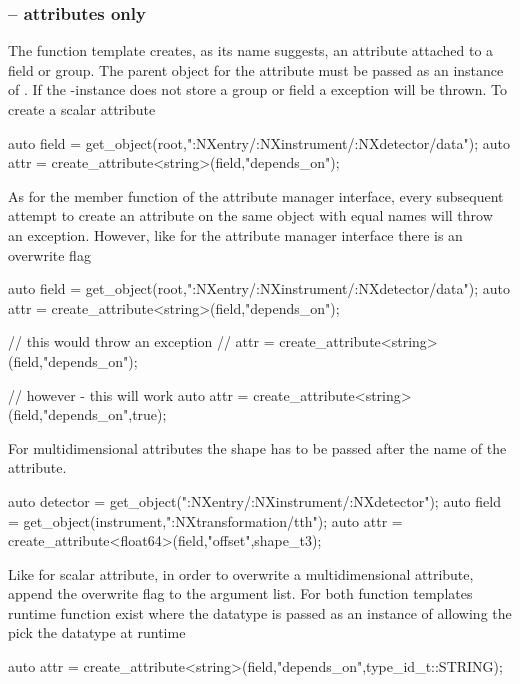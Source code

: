 \subsubsection{ -- attributes only}

The  function template creates, as its name suggests, 
an attribute attached to a field or group. The parent object for the attribute
must be passed as an instance of \nxobject. If the \nxobject-instance 
does not store a group or field a  exception will be thrown. 
To create a scalar attribute 
\begin{cppcode}
auto field = get_object(root,":NXentry/:NXinstrument/:NXdetector/data");
auto attr = create_attribute<string>(field,"depends_on");
\end{cppcode}
As for the  member function of the attribute manager interface, 
every subsequent attempt to create an attribute on the same object with 
equal names will throw an exception. However, like for the attribute manager 
interface there is an overwrite flag
\begin{cppcode}
auto field = get_object(root,":NXentry/:NXinstrument/:NXdetector/data");
auto attr = create_attribute<string>(field,"depends_on");

// this would throw an exception
// attr = create_attribute<string>(field,"depends_on");

// however - this will work
auto attr = create_attribute<string>(field,"depends_on",true);
\end{cppcode}
For multidimensional attributes the shape has to be passed after the 
name of the attribute. 
\begin{cppcode}
auto detector = get_object(":NXentry/:NXinstrument/:NXdetector");
auto field = get_object(instrument,":NXtransformation/tth");
auto attr  = create_attribute<float64>(field,"offset",shape_t{3});
\end{cppcode}
Like for scalar attribute, in order to overwrite a multidimensional 
attribute, append the overwrite flag to the argument list. 
For both function templates runtime function exist where the 
datatype is passed as an instance of  
allowing the pick the datatype at runtime
\begin{cppcode}
auto attr = create_attribute<string>(field,"depends_on",type_id_t::STRING);
\end{cppcode}

